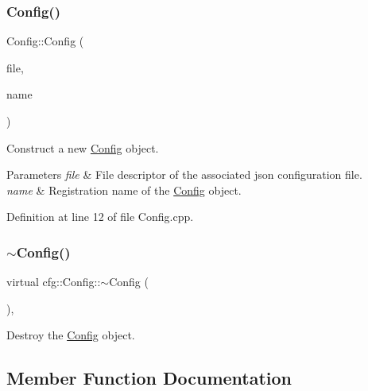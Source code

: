 \subsubsection{\texorpdfstring{Config()}{Config()}}
{\footnotesize\ttfamily Config\+::\+Config (\begin{DoxyParamCaption}\item[{const \hyperlink{namespacecfg_af0aed6e47bd26e91ad7d69467f96caaf}{File\+Descriptor} \&}]{file,  }\item[{const std\+::string \&}]{name }\end{DoxyParamCaption})}



Construct a new \hyperlink{classcfg_1_1_config}{Config} object. 


\begin{DoxyParams}{Parameters}
{\em file} & File descriptor of the associated json configuration file. \\
\hline
{\em name} & Registration name of the \hyperlink{classcfg_1_1_config}{Config} object. \\
\hline
\end{DoxyParams}


Definition at line 12 of file Config.\+cpp.

\mbox{\label{classcfg_1_1_config_a1b74ecb20fb34c56ac3257066e4c065f}} 
\subsubsection{\texorpdfstring{$\sim$\+Config()}{~Config()}}
{\footnotesize\ttfamily virtual cfg\+::\+Config\+::$\sim$\+Config (\begin{DoxyParamCaption}{ }\end{DoxyParamCaption})\hspace{0.3cm}{\ttfamily [virtual]}, {\ttfamily [default]}}



Destroy the \hyperlink{classcfg_1_1_config}{Config} object. 



\subsection{Member Function Documentation}
\mbox{\label{classcfg_1_1_config_a76cb1f6d83b6d06eee652c80d32e9084}} 
